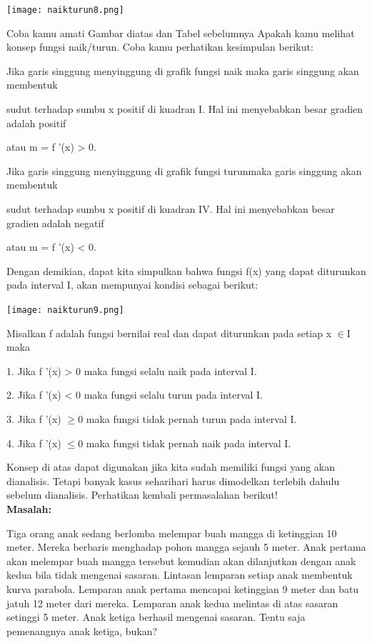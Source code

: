 \documentclass[11pt,fleqn]{book} %
\begin{document}
\begin{center}
\texttt{[image: naikturun8.png]}
\end{center}

Coba kamu amati Gambar diatas dan Tabel sebelumnya Apakah kamu melihat konsep fungsi naik/turun. Coba kamu perhatikan kesimpulan berikut:

Jika garis singgung menyinggung di grafik fungsi naik maka garis singgung akan membentuk 

sudut terhadap sumbu x positif di kuadran I. Hal ini menyebabkan besar gradien adalah positif 

atau m = f '(x) > 0.

Jika garis singgung menyinggung di grafik fungsi turunmaka garis singgung akan membentuk 

sudut terhadap sumbu x positif di kuadran IV. Hal ini menyebabkan besar gradien adalah negatif 

atau m = f '(x) < 0.

Dengan demikian, dapat kita simpulkan bahwa fungsi f(x) yang dapat diturunkan pada interval I, akan mempunyai kondisi sebagai berikut:

\begin{center}
\texttt{[image: naikturun9.png]}
\end{center}

Misalkan f adalah fungsi bernilai real dan dapat
diturunkan pada setiap x $\in $I maka

1. Jika f '(x) > 0 maka fungsi selalu naik pada interval I.

2. Jika f '(x) < 0 maka fungsi selalu turun pada interval I.

3. Jika f '(x) $\geqslant $0 maka fungsi tidak pernah turun pada interval I.

4. Jika f '(x) $\leqslant $0 maka fungsi tidak pernah naik pada interval I.

Konsep di atas dapat digunakan jika kita sudah memiliki fungsi yang akan dianalisis. Tetapi banyak kasus seharihari harus dimodelkan terlebih dahulu sebelum dianalisis. Perhatikan kembali permasalahan berikut!\\

\textbf{Masalah:}

Tiga orang anak sedang berlomba melempar buah mangga di ketinggian 10 meter. Mereka berbaris menghadap pohon mangga sejauh 5 meter. Anak pertama akan melempar buah mangga tersebut kemudian akan dilanjutkan dengan anak kedua bila tidak mengenai sasaran. Lintasan lemparan setiap anak membentuk kurva parabola. Lemparan anak pertama mencapai ketinggian 9 meter dan batu jatuh 12 meter dari mereka. Lemparan anak kedua melintas di atas sasaran setinggi 5 meter. Anak ketiga berhasil mengenai sasaran. Tentu saja pemenangnya anak ketiga, bukan?
\\
\end{document}
